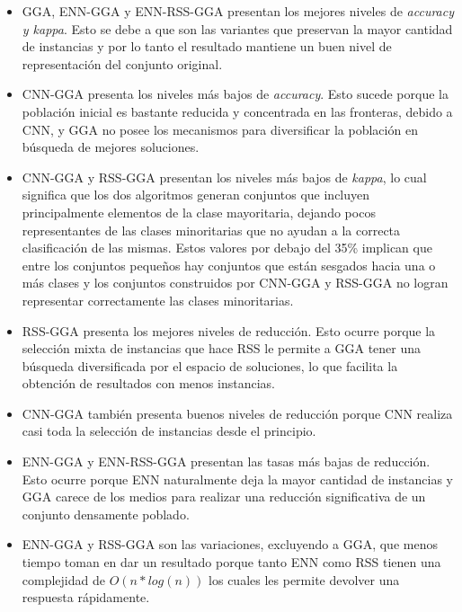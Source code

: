 \begin{itemize}

\item GGA, ENN-GGA y ENN-RSS-GGA presentan los mejores niveles de \emph{accuracy y kappa}. Esto se debe a que son las variantes que preservan la mayor cantidad de instancias y por lo tanto el resultado mantiene un buen nivel de representación del conjunto original.

\item CNN-GGA presenta los niveles más bajos de \emph{accuracy}. Esto sucede porque la población inicial es bastante reducida y concentrada en las fronteras, debido a CNN, y GGA no posee los mecanismos para diversificar la población en búsqueda de mejores soluciones.

\item CNN-GGA y RSS-GGA presentan los niveles más bajos de \emph{kappa}, lo cual significa que los dos algoritmos generan conjuntos que incluyen principalmente elementos de la clase mayoritaria, dejando pocos representantes de las clases minoritarias que no ayudan a la correcta clasificación de las mismas. Estos valores por debajo del 35\% implican que entre los conjuntos pequeños hay conjuntos que están sesgados hacia una o más clases y los conjuntos construidos por CNN-GGA y RSS-GGA no logran representar correctamente las clases minoritarias.

\item RSS-GGA presenta los mejores niveles de reducción. Esto ocurre porque la selección mixta de instancias que hace RSS le permite a GGA tener una búsqueda diversificada por el espacio de soluciones, lo que facilita la obtención de resultados con menos instancias.

\item CNN-GGA también presenta buenos niveles de reducción porque CNN realiza casi toda la selección de instancias desde el principio.

\item ENN-GGA y ENN-RSS-GGA presentan las tasas más bajas de reducción. Esto ocurre porque ENN naturalmente deja la mayor cantidad de instancias y GGA carece de los medios para realizar una reducción significativa de un conjunto densamente poblado.

\item ENN-GGA y RSS-GGA son las variaciones, excluyendo a GGA, que menos tiempo toman en dar un resultado porque tanto ENN como RSS tienen una complejidad de $O(n*log(n))$ los cuales les permite devolver una respuesta rápidamente.


\end{itemize}
